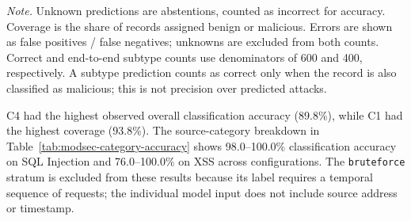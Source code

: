 \begin{table}[H]
\centering
\caption{Classification and end-to-end attack-subtype accuracy on the 600-record ModSec-WP analytical cohort.}
\label{tab:modsec-classification}
{\small
\setlength{\tabcolsep}{3pt}
}
\par\smallskip
\begin{minipage}{\textwidth}\footnotesize
\textit{Note.} Unknown predictions are abstentions, counted as incorrect
for accuracy. Coverage is the share of records assigned benign or
malicious. Errors are shown as false positives / false negatives; unknowns
are excluded from both counts. Correct and end-to-end subtype counts use
denominators of 600 and 400, respectively. A subtype prediction counts
as correct only when the record is also classified as malicious; this is
not precision over predicted attacks.
\end{minipage}
\end{table}

C4 had the highest observed overall classification accuracy (89.8\%),
while C1 had the highest coverage (93.8\%). The source-category
breakdown in Table~\ref{tab:modsec-category-accuracy} shows
98.0--100.0\% classification accuracy on SQL Injection and
76.0--100.0\% on XSS across configurations. The \texttt{bruteforce}
stratum is excluded from these results because its label requires a
temporal sequence of requests; the individual model input does not
include source address or timestamp.

